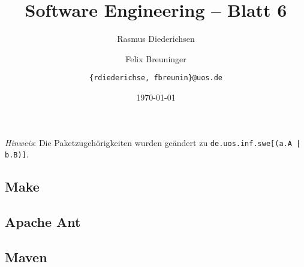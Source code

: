 \documentclass{scrartcl}
\title{\rmfamily Software Engineering -- Blatt 6}
\author{Rasmus Diederichsen \and Felix Breuninger\and 
   \texttt{\{rdiederichse, fbreunin\}@uos.de}
}
\date{\today}
\begin{document}
\selectfont
\maketitle

\setcounter{section}{6}
\setcounter{subsection}{0}

\emph{Hinweis}: Die Paketzugehörigkeiten wurden geändert zu \texttt{de.uos.inf.swe[(a.A | b.B)]}.

\subsection{Make}



\subsection{Apache Ant}





\subsection{Maven}
\end{document}
